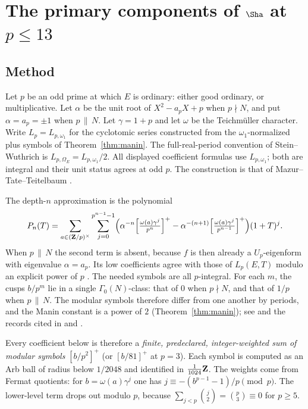 \section[Primary components at primes up to 13]{The primary components of $\Sha$ at $p\le13$}\label{sec:primary}

\subsection{Method}\label{subsec:method}
Let $p$ be an odd prime at which $E$ is ordinary: either good ordinary, or multiplicative. Let $\alpha$ be the unit root of $X^2-a_pX+p$ when $p\nmid N$, and put $\alpha=a_p=\pm1$ when $p\,\|\,N$. Let $\gamma=1+p$ and let $\omega$ be the Teichm\"uller character. Write $L_p=L_{p,\omega_1}$ for the cyclotomic series constructed from the $\omega_1$-normalized plus symbols of Theorem~\ref{thm:manin}. The full-real-period convention of Stein--Wuthrich \cite{sw} is $L_{p,\Omega_E}=L_{p,\omega_1}/2$. All displayed coefficient formulas use $L_{p,\omega_1}$; both are integral and their unit status agrees at odd $p$. The construction is that of Mazur--Tate--Teitelbaum \cite{mtt}.

The depth-$n$ approximation is the polynomial
\[
P_n(T)=\sum_{a\in(\mathbf{Z}/p)^\times}\sum_{j=0}^{p^{n-1}-1}\Bigl(\alpha^{-n}\Bigl[\tfrac{\omega(a)\gamma^j}{p^n}\Bigr]^+-\alpha^{-(n+1)}\Bigl[\tfrac{\omega(a)\gamma^j}{p^{n-1}}\Bigr]^+\Bigr)(1+T)^j .
\]
When $p\,\|\,N$ the second term is absent, because $f$ is then already a $U_p$-eigenform with eigenvalue $\alpha=a_p$. Its low coefficients agree with those of $L_p(E,T)$ modulo an explicit power of $p$ \cite[Prop.~3.5]{sw}. The needed symbols are all $p$-integral. For each $m$, the cusps $b/p^m$ lie in a single $\Gamma_0(N)$-class: that of $0$ when $p\nmid N$, and that of $1/p$ when $p\,\|\,N$. The modular symbols therefore differ from one another by periods, and the Manin constant is a power of $2$ (Theorem~\ref{thm:manin}); see \cite[\S3]{sw} and the records cited in  and .

Every coefficient below is therefore a \emph{finite, predeclared, integer-weighted sum of modular symbols} $[b/p^2]^+$ (or $[b/81]^+$ at $p=3$). Each symbol is computed as an Arb ball of radius below $1/2048$ and identified in $\frac1{1024}\mathbf{Z}$. The weights come from Fermat quotients: for $b=\omega(a)\gamma^j$ one has $j\equiv-(b^{p-1}-1)/p\pmod p$. The lower-level term drops out modulo $p$, because $\sum_{j<p}\binom j2=\binom p3\equiv0$ for $p\ge5$.

